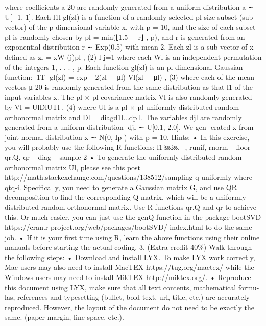 \documentclass{article}
\begin{document}
where coefficients {a }20 are randomly generated from a uniform distribution a ∼ U[−1, 1]. Each l1l
gl(zl) is a function of a randomly selected pl-size subset (sub-vector) of the p-dimensional variable x, with p = 10, and the size of each subset pl is randomly chosen by pl = min(⌊1.5 + r⌋ , p), and r is generated from an exponential distribution r ∼ Exp(0.5) with mean 2. Each zl is a sub-vector of x defined as
zl = {xW (j)}pl , (2) l j=1
where each Wl is an independent permutation of the integers {1, . . . , p}. Each function gl(zl) is an pl-dimensional Gaussian function:
􏰋1T􏰌
gl(zl) = exp −2(zl − μl) Vl(zl − μl) , (3)
where each of the mean vectors {μ }20 is randomly generated from the same distribution as that l1
of the input variables x. The pl × pl covariance matrix Vl is also randomly generated by
Vl = UlDlUTl , (4)
where Ul is a pl × pl uniformly distributed random orthonormal matrix and Dl = diag{d1l...dpll}. The variables djl are randomly generated from a uniform distribution 􏰉djl ∼ U[0.1, 2.0]. We gen- erated x from joint normal distribution x ∼ N(0, Ip ) with p = 10.
Hints:
• In this exercise, you will probably use the following R functions:
l1
￼￼– , runif, rnorm – floor
– qr.Q, qr
– diag
– sample
2
• To generate the uniformly distributed random orthonormal matrix Ul, please see
this post
http://math.stackexchange.com/questions/138512/sampling-q-uniformly-where-qtq-i.
Specifically, you need to generate a Gaussian matrix G, and use QR decomposition
to find the corresponding Q matrix, which will be a uniformly distributed random
orthonormal matrix. Use R functions qr.Q and qr to achieve this. Or much easier,
you can just use the genQ function in the package bootSVD
https://cran.r-project.org/web/packages/bootSVD/ index.html to do the same
job.
• If it is your first time using R, learn the above functions using their
online manuals before starting the actual coding.
3. (Extra credit 40\%) Walk
through the following steps:
• Download and install LYX. To make LYX work
correctly, Mac users may also need to install MacTEX https://tug.org/mactex/
while the Windows users may need to install MikTEX http://miktex.org/.
•
Reproduce this document using LYX, make sure that all text contents,
mathematical formu- las, references and typesetting (bullet, bold text, url,
title, etc.) are accurately reproduced. However, the layout of the document do
not need to be exactly the same. (paper margin, line space, etc.).

 
 
\end{document}
